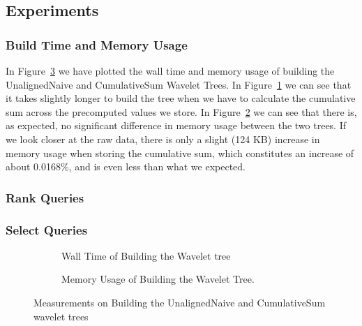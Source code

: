 \subsection{Experiments}

\subsubsection{Build Time and Memory Usage}
In Figure~\ref{fig:CumulativeSumBuild} we have plotted the wall time and memory usage of building the UnalignedNaive and CumulativeSum Wavelet Trees.
In Figure~\ref{fig:CumulativeSumBuildWalltime} we can see that it takes slightly longer to build the tree when we have to calculate the cumulative sum across the precomputed values we store.
In Figure~\ref{fig:CumulativeSumBuildMemoryUsage} we can see that there is, as expected, no significant difference in memory usage between the two trees.
If we look closer at the raw data, there is only a slight (124 KB) increase in memory usage when storing the cumulative sum, which constitutes an increase of about 0.0168\%, and is even less than what we expected.

\subsubsection{Rank Queries}


\subsubsection{Select Queries}



\begin{figure}\tiny
\begin{subfigure}{0.48\textwidth}
	
	\caption{Wall Time of Building the Wavelet tree}
	\label{fig:CumulativeSumBuildWalltime}
\end{subfigure}
\hfill
\begin{subfigure}{0.48\textwidth}
	
	\caption{Memory Usage of Building the Wavelet Tree.}
	\label{fig:CumulativeSumBuildMemoryUsage}
\end{subfigure}
\caption{Measurements on Building the UnalignedNaive and CumulativeSum wavelet trees}
\label{fig:CumulativeSumBuild}
\end{figure}



